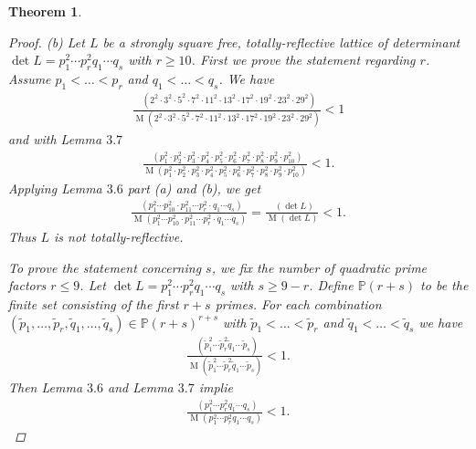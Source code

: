 \documentclass{amsart}
\newtheorem{thm}{Theorem}[section]
\theoremstyle{definition}
\theoremstyle{remark}
\def\PP{\mathbb{P}}
\DeclareMathOperator{\M}{M}
\DeclareMathOperator{\Mref}{M_{ref}}
\begin{document}
\begin{thm}
\begin{proof}
 (b) Let $L$ be a strongly square free, totally-reflective lattice of determinant $\det L = p_1^2 \cdots p_r^2 q_1 \cdots q_s$ with $r \geq 10$. 
 First we prove the statement regarding $r$.
 Assume $p_1 < \dots < p_r$ and $q_1 < \dots < q_s$. We have 
 \begin{align*}
  \frac{\Mref(2^2 \cdot 3^2 \cdot 5^2 \cdot 7^2 \cdot 11^2 \cdot 13^2 \cdot 17^2 \cdot 19^2 \cdot 23^2 \cdot 29^2)}
       {\M(2^2 \cdot 3^2 \cdot 5^2 \cdot 7^2 \cdot 11^2 \cdot 13^2 \cdot 17^2 \cdot 19^2 \cdot 23^2 \cdot 29^2)} < 1
 \end{align*}
 and with Lemma $3.7$
 \begin{align*}
  \frac{\Mref(p_1^2 \cdot p_2^2 \cdot p_3^2 \cdot p_4^2 \cdot p_5^2 \cdot p_6^2 \cdot p_7^2 \cdot p_8^2 \cdot p_9^2 \cdot p_{10}^2)}
       {\M(p_1^2 \cdot p_2^2 \cdot p_3^2 \cdot p_4^2 \cdot p_5^2 \cdot p_6^2 \cdot p_7^2 \cdot p_8^2 \cdot p_9^2 \cdot p_{10}^2)} < 1.
 \end{align*}
 Applying Lemma $3.6$ part (a) and (b), we get
 \begin{align*}
  \frac{\Mref(p_1^2 \cdots p_{10}^2 \cdot p_{11}^2 \cdots p_{r}^2 \cdot q_1 \cdots q_s)}
       {\M(p_1^2 \cdots p_{10}^2 \cdot p_{11}^2 \cdots p_{r}^2 \cdot q_1 \cdots q_s)} = \frac{\Mref(\det L)}{\M(\det L)} < 1.
 \end{align*}
 Thus $L$ is not totally-reflective.

 To prove the statement concerning $s$, we fix the number of quadratic prime factors $r \leq 9$. Let $\det L = p_1^2 \cdots p_r^2 q_1 \cdots q_s$ with $s \geq 9-r$.
 Define $\PP(r+s)$ to be the finite set consisting of the first $r+s$ primes. For each combination $(\tilde{p}_1, \dots, \tilde{p}_r,\tilde{q}_1, \dots, \tilde{q}_s) \in \PP(r+s)^{r+s}$ 
 with $\tilde{p}_1 < \dots < \tilde{p}_r$ and $\tilde{q}_1 < \dots < \tilde{q}_s$ we have
  \begin{align*}
  \frac{\Mref(\tilde{p}_1^2 \cdots \tilde{p}_r^2 \tilde{q}_1 \cdots \tilde{p}_s)}
       {\M(\tilde{p}_1^2 \cdots \tilde{p}_r^2 \tilde{q}_1 \cdots \tilde{p}_s)} < 1.
 \end{align*}
 Then Lemma $3.6$ and Lemma $3.7$ implie
   \begin{align*}
  \frac{\Mref(p_1^2 \cdots p_r^2 q_1 \cdots q_s)}
       {\M(p_1^2 \cdots p_r^2 q_1 \cdots q_s)} < 1.
 \end{align*}
 \end{proof}
\end{thm}
\end{document}
